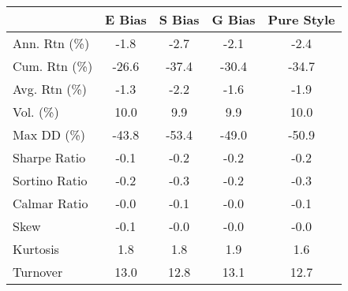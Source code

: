 \begin{tabular}{lcccc}
\toprule
 & E Bias & S Bias & G Bias & Pure Style \\
\midrule
Ann. Rtn (\%) & -1.8 & -2.7 & -2.1 & -2.4 \\
Cum. Rtn (\%) & -26.6 & -37.4 & -30.4 & -34.7 \\
Avg. Rtn (\%) & -1.3 & -2.2 & -1.6 & -1.9 \\
Vol. (\%) & 10.0 & 9.9 & 9.9 & 10.0 \\
Max DD (\%) & -43.8 & -53.4 & -49.0 & -50.9 \\
Sharpe Ratio & -0.1 & -0.2 & -0.2 & -0.2 \\
Sortino Ratio & -0.2 & -0.3 & -0.2 & -0.3 \\
Calmar Ratio & -0.0 & -0.1 & -0.0 & -0.1 \\
Skew & -0.1 & -0.0 & -0.0 & -0.0 \\
Kurtosis & 1.8 & 1.8 & 1.9 & 1.6 \\
Turnover & 13.0 & 12.8 & 13.1 & 12.7 \\
\bottomrule
\end{tabular}
